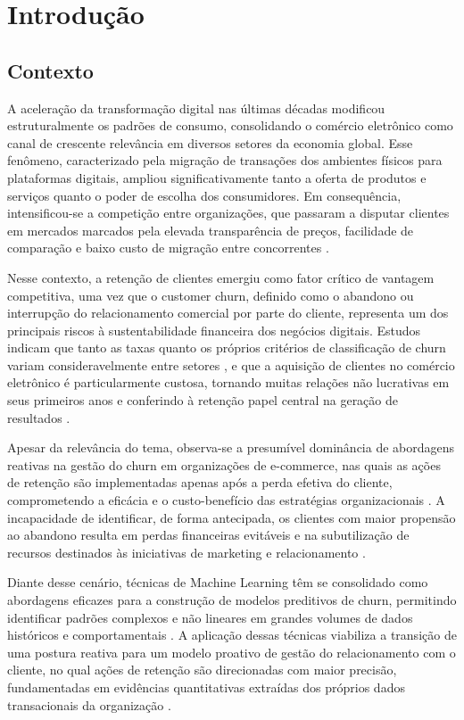 \chapter{Introdução} \label{Cap:Introducao}

\FloatBarrier
\section{Contexto} \label{sec:contexto}

A aceleração da transformação digital nas últimas décadas modificou estruturalmente os padrões de consumo, consolidando o comércio eletrônico como canal de crescente relevância em diversos setores da economia global. Esse fenômeno, caracterizado pela migração de transações dos ambientes físicos para plataformas digitais, ampliou significativamente tanto a oferta de produtos e serviços quanto o poder de escolha dos consumidores. Em consequência, intensificou-se a competição entre organizações, que passaram a disputar clientes em mercados marcados pela elevada transparência de preços, facilidade de comparação e baixo custo de migração entre concorrentes \cite{turban2018}.

Nesse contexto, a retenção de clientes emergiu como fator crítico de vantagem competitiva, uma vez que o customer churn, definido como o abandono ou interrupção do relacionamento comercial por parte do cliente, representa um dos principais riscos à sustentabilidade financeira dos negócios digitais. Estudos indicam que tanto as taxas quanto os próprios critérios de classificação de churn variam consideravelmente entre setores \cite{imani2025}, e que a aquisição de clientes no comércio eletrônico é particularmente custosa, tornando muitas relações não lucrativas em seus primeiros anos e conferindo à retenção papel central na geração de resultados \cite{reichheld2000}.

Apesar da relevância do tema, observa-se a presumível dominância de abordagens reativas na gestão do churn em organizações de e-commerce, nas quais as ações de retenção são implementadas apenas após a perda efetiva do cliente, comprometendo a eficácia e o custo-benefício das estratégias organizacionais \cite{hadden2007,matuszelanski2022}. A incapacidade de identificar, de forma antecipada, os clientes com maior propensão ao abandono resulta em perdas financeiras evitáveis e na subutilização de recursos destinados às iniciativas de marketing e relacionamento \cite{neslin2006}.

Diante desse cenário, técnicas de Machine Learning têm se consolidado como abordagens eficazes para a construção de modelos preditivos de churn, permitindo identificar padrões complexos e não lineares em grandes volumes de dados históricos e comportamentais \cite{imani2025}. A aplicação dessas técnicas viabiliza a transição de uma postura reativa para um modelo proativo de gestão do relacionamento com o cliente, no qual ações de retenção são direcionadas com maior precisão, fundamentadas em evidências quantitativas extraídas dos próprios dados transacionais da organização \cite{manzoor2024}.

